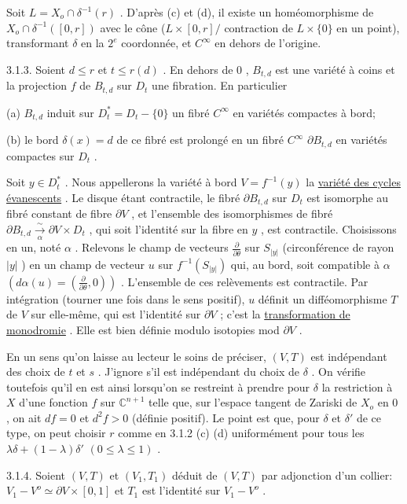 Soit $L = X_o \cap \delta^{-1}(r)$ . D'après (c) et (d), il existe un homéomorphisme de $X_o \cap \delta^{-1}([0, r])$ avec le cône ($L \times [0, r]/$ contraction de $L \times \{0\}$ en un point), transformant $\delta$ en la $2^e$ coordonnée, et $C^\infty$ en dehors de l'origine.

3.1.3. Soient $d \leq r$ et $t \leq r(d)$ . En dehors de $0$ , $B_{t,d}$ est une variété à coins et la projection $f$ de $B_{t,d}$ sur $D_t$ une fibration. En particulier

(a) $B_{t,d}$ induit sur $D_t^* = D_t - \{0\}$ un fibré $C^\infty$ en variétés compactes à bord;

(b) le bord $\delta(x) = d$ de ce fibré est prolongé en un fibré $C^\infty$ $\partial B_{t,d}$ en variétés compactes sur $D_t$ .

Soit $y \in D_t^*$ . Nous appellerons la variété à bord $V = f^{-1}(y)$ la \underline{variété des cycles évanescents} . Le disque étant contractile, le fibré $\partial B_{t,d}$ sur $D_t$ est isomorphe au fibré constant de fibre $\partial V$ , et l'ensemble des isomorphismes de fibré $\partial B_{t,d} \xrightarrow[\alpha]{\sim} \partial V \times D_t$ , qui soit l'identité sur la fibre en $y$ , est contractile. Choisissons en un, noté $\alpha$ . Relevons le champ de vecteurs $\frac{\partial}{\partial\theta}$ sur $S_{|y|}$ (circonférence de rayon $|y|$ ) en un champ de vecteur $u$ sur $f^{-1}(S_{|y|})$ qui, au bord, soit compatible à $\alpha$ $(d\alpha(u) = (\frac{\partial}{\partial\theta} , 0))$ . L'ensemble de ces relèvements est contractile. Par intégration (tourner une fois dans le sens positif), $u$ définit un difféomorphisme $T$ de $V$ sur elle-même, qui est l'identité sur $\partial V$ ; c'est la \underline{transformation de monodromie} . Elle est bien définie modulo isotopies mod $\partial V$ .

En un sens qu'on laisse au lecteur le soins de préciser, $(V, T)$ est indépendant des choix de $t$ et $s$ . J'ignore s'il est indépendant du choix de $\delta$ . On vérifie toutefois qu'il en est ainsi lorsqu'on se restreint à prendre pour $\delta$ la restriction à $X$ d'une fonction $f$ sur $\mathbb{C}^{n+1}$ telle que, sur l'espace tangent de Zariski de $X_o$ en $0$ , on ait $df = 0$ et $d^2f > 0$ (définie positif). Le point est que, pour $\delta$ et $\delta'$ de ce type, on peut choisir $r$ comme en 3.1.2 (c) (d) uniformément pour tous les $\lambda\delta + (1-\lambda)\delta'$ $(0 \leq \lambda \leq 1)$ .

3.1.4. Soient $(V, T)$ et $(V_1, T_1)$ déduit de $(V, T)$ par adjonction d'un collier:
$V_1 - V^o \simeq \partial V \times [0, 1]$ et $T_1$ est l'identité sur $V_1 - V^o$ .

